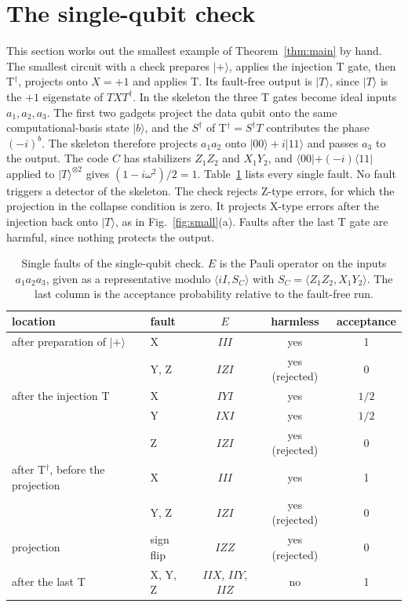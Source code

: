 \documentclass[aps,prl,reprint,twocolumn,amsmath,amssymb,floatfix,nofootinbib,superscriptaddress]{revtex4-2}
\theoremstyle{definition}
\theoremstyle{remark}
\begin{document}
\section{The single-qubit check}\label{sm:example}
This section works out the smallest example of Theorem~\ref{thm:main} by hand. The smallest circuit with a check prepares $|+\rangle$, applies the injection T gate, then T$^\dagger$, projects onto $X=+1$ and applies T. Its fault-free output is $|T\rangle$, since $|T\rangle$ is the $+1$ eigenstate of $TXT^\dagger$. In the skeleton the three T gates become ideal inputs $a_1,a_2,a_3$. The first two gadgets project the data qubit onto the same computational-basis state $|b\rangle$, and the $S^\dagger$ of T$^\dagger=S^\dagger T$ contributes the phase $(-i)^b$. The skeleton therefore projects $a_1a_2$ onto $|00\rangle+i|11\rangle$ and passes $a_3$ to the output. The code $C$ has stabilizers $Z_1Z_2$ and $X_1Y_2$, and $\langle00|+(-i)\langle11|$ applied to $|T\rangle^{\otimes2}$ gives $(1-i\omega^2)/2=1$. Table~\ref{tab:example} lists every single fault. No fault triggers a detector of the skeleton. The check rejects Z-type errors, for which the projection in the collapse condition is zero. It projects X-type errors after the injection back onto $|T\rangle$, as in Fig.~\ref{fig:small}(a). Faults after the last T gate are harmful, since nothing protects the output.

\begin{table}[h]
\caption{Single faults of the single-qubit check. $E$ is the Pauli operator on the inputs $a_1a_2a_3$, given as a representative modulo $\langle iI,S_C\rangle$ with $S_C=\langle Z_1Z_2,X_1Y_2\rangle$. The last column is the acceptance probability relative to the fault-free run.}
\label{tab:example}
\begin{ruledtabular}
\begin{tabular}{llccc}
location & fault & $E$ & harmless & acceptance\\
\hline
after preparation of $|+\rangle$ & X & $III$ & yes & 1\\
 & Y, Z & $IZI$ & yes (rejected) & 0\\
after the injection T & X & $IYI$ & yes & $1/2$\\
 & Y & $IXI$ & yes & $1/2$\\
 & Z & $IZI$ & yes (rejected) & 0\\
after T$^\dagger$, before the projection & X & $III$ & yes & 1\\
 & Y, Z & $IZI$ & yes (rejected) & 0\\
projection & sign flip & $IZZ$ & yes (rejected) & 0\\
after the last T & X, Y, Z & $IIX$, $IIY$, $IIZ$ & no & 1\\
\end{tabular}
\end{ruledtabular}
\end{table}
\end{document}
